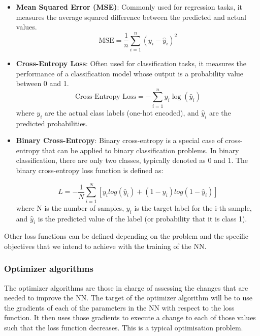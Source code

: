 \documentclass[a4paper, 11pt]{report}
\begin{document}
\begin{itemize}

    \item \textbf{Mean Squared Error (MSE)}: Commonly used for regression tasks, it measures the average squared difference between the predicted and actual values.
    $$ \text{MSE} = \frac{1}{n}\sum^n_{i=1}\left(y_i-\hat{y}_i\right)^2$$

    \item \textbf{Cross-Entropy Loss}: Often used for classification tasks, it measures the performance of a classification model whose output is a probability value between 0 and 1.
    \begin{equation*}
    \text{Cross-Entropy Loss} = -\sum_{i=1}^{n} y_i \log(\hat{y}_i)
    \end{equation*}
    where \(y_i\) are the actual class labels (one-hot encoded), and \(\hat{y}_i\) are the predicted probabilities.

    \item{\textbf{Binary Cross-Entropy}:}
    Binary cross-entropy is a special case of cross-entropy that can be applied to binary classification problems. In binary classification, there are only two classes, typically denoted as 0 and 1. The binary cross-entropy loss function is defined as:

    \begin{equation*}
        L = -\frac{1}{N}\sum_{i=1}^N\left[y_i log(\hat{y}_i) + (1 - y_i)log(1-\hat{y}_i)\right]
    \end{equation*}
    where N is the number of samples, $y_i$ is the target label for the i-th sample, and $\hat{y}_i$ is the predicted value of the label (or probability that it is class 1).

\end{itemize}

Other loss functions can be defined depending on the problem and the specific objectives that we intend to achieve with the training of the NN.

\subsubsection{Optimizer algorithms}\label{Theory: Optimizers}
The optimizer algorithms are those in charge of assessing the changes that are needed to improve the NN. The target of the optimizer algorithm will be to use the gradients of each of the parameters in the NN with respect to the loss function. It then uses those gradients to execute a change to each of those values such that the loss function decreases. This is a typical optimisation problem.
\end{document}
